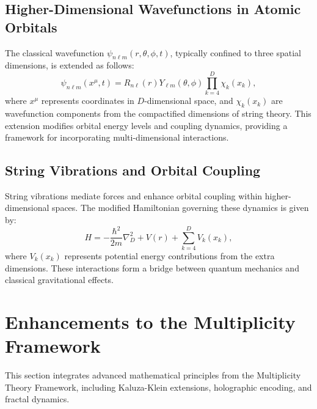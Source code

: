 \documentclass[12]{amsart}
\theoremstyle{plain}
\begin{document}
\subsection{Higher-Dimensional Wavefunctions in Atomic Orbitals}
The classical wavefunction \( \psi_{n\ell m}(r, \theta, \phi, t) \), typically confined to three spatial dimensions, is extended as follows:
\begin{equation}
\psi_{n\ell m}(x^\mu, t) = R_{n\ell}(r)Y_{\ell m}(\theta, \phi) \prod_{k=4}^{D} \chi_k(x_k),
\end{equation}
where \( x^\mu \) represents coordinates in \( D \)-dimensional space, and \( \chi_k(x_k) \) are wavefunction components from the compactified dimensions of string theory. This extension modifies orbital energy levels and coupling dynamics, providing a framework for incorporating multi-dimensional interactions.

\subsection{String Vibrations and Orbital Coupling}
String vibrations mediate forces and enhance orbital coupling within higher-dimensional spaces. The modified Hamiltonian governing these dynamics is given by:
\begin{equation}
H = -\frac{\hbar^2}{2m}\nabla_D^2 + V(r) + \sum_{k=4}^{D} V_k(x_k),
\end{equation}
where \( V_k(x_k) \) represents potential energy contributions from the extra dimensions. These interactions form a bridge between quantum mechanics and classical gravitational effects.

\section{Enhancements to the Multiplicity Framework}
This section integrates advanced mathematical principles from the Multiplicity Theory Framework, including Kaluza-Klein extensions, holographic encoding, and fractal dynamics.
\end{document}
